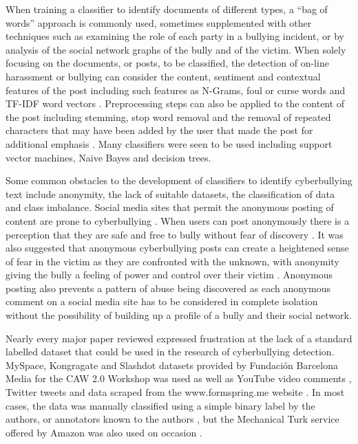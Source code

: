 When training a classifier to identify documents of different types, a ``bag of words'' approach is commonly used, sometimes supplemented with other techniques such as examining the role of each party in a bullying incident, or by analysis of the social network graphs of the bully and of the victim. When solely focusing on the documents, or posts, to be classified, the detection of on-line harassment or bullying can consider the content, sentiment and contextual features of the post including such features as N-Grams, foul or curse words and TF-IDF word vectors \cite{yin_detection_2009}. Preprocessing steps can also be applied to the content of the post including stemming, stop word removal and the removal of repeated characters that may have been added by the user that made the post for additional emphasis \cite{dinakar_modeling_2011}. Many classifiers were seen to be used including support vector machines, Naive Bayes and decision trees.

Some common obstacles to the development of classifiers to identify cyberbullying text include anonymity, the lack of suitable datasets, the classification of data and class imbalance. Social media sites that permit the anonymous posting of content are prone to cyberbullying \cite{kontostathis_detecting_2013} \cite{reynolds_using_2011}. When users can post anonymously there is a perception that they are safe and free to bully without fear of discovery \cite{yin_detection_2009}.  It was also suggested that anonymous cyberbullying posts can create a heightened sense of fear in the victim as they are confronted with the unknown, with anonymity giving the bully a feeling of power and control over their victim \cite{nahar_effective_2013}. Anonymous posting also prevents a pattern of abuse being discovered as each anonymous comment on a social media site has to be considered in complete isolation without the possibility of building up a profile of a bully and their social network.

Nearly every major paper reviewed expressed frustration at the lack of a standard labelled dataset that could be used in the research of cyberbullying detection. MySpace, Kongragate and Slashdot datasets provided by Fundación Barcelona Media for the CAW 2.0 Workshop \cite{fundacion_barcelona_media_fbm_caw_2009} was used \cite{nahar_effective_2013} \cite{yin_detection_2009} as well as  YouTube video comments \cite{dadvar_improving_2013} \cite{dinakar_modeling_2011}, Twitter tweets \cite{xu_fast_2012} \cite{xu_learning_2012} and data scraped from the www.formspring.me website \cite{kontostathis_detecting_2013} \cite{reynolds_using_2011}. In most cases, the data was manually classified using a simple binary label by the authors, or annotators known to the authors \cite{dadvar_towards_2012} \cite{dadvar_improving_2013} \cite{dinakar_modeling_2011} \cite{yin_detection_2009}, but the Mechanical Turk service offered by Amazon was also used on occasion \cite{kontostathis_detecting_2013} \cite{reynolds_using_2011}.

